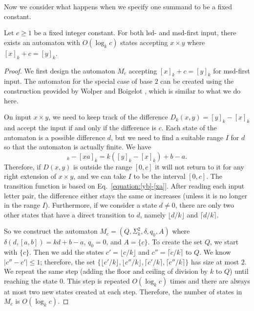 \documentclass[12pt,reqno]{article}
\begin{document}
Now we consider what happens when we specify one summand to be a fixed constant.
\begin{theorem} \label{theorem:[x]+c=[y]-construction}
Let $c \geq 1$ be a fixed integer constant.
For both lsd- and msd-first input, there exists an automaton with $O(\log_k c)$
states accepting $x \times y$ where $[x]_k + c = [y]_k$.
\end{theorem}

\begin{proof}
    We first design the automaton $M_c$ accepting $[x]_k + c = [y]_k$ for msd-first input.
    The automaton for the special case of base $2$ can be created using the construction provided by Wolper and Boigelot \cite{wolper_construction_2000}, which is similar to what we do here. 
    
    On input $x \times y$, we need to keep track of the difference $D_k(x, y) = [y]_k - [x]_k$ and accept the input if and only if the difference is $c$. Each state of the automaton is a possible difference $d$, but we need to find a suitable range $I$ for $d$ so that the automaton is actually finite.
    We have
  \begin{equation}
    [yb]_k - [xa]_k = k([y]_k-[x]_k) + b - a.
    \label{equation:[yb]-[xa]}
    \end{equation}
    Therefore, if $D(x, y)$ is outside the range $[0, c]$ it will not return to it for any right extension of $x\times y$, and  we can take $I$ to be the interval $[0, c]$.
    The transition function is based on Eq.~\eqref{equation:[yb]-[xa]}.  After reading each input letter pair, the difference either stays the same or increases (unless it is no longer in the range $I$).
    Furthermore, if we consider a state $d \neq 0$, there are only two other states that have a direct transition to $d$, namely $\lfloor d/k \rfloor$ and $\lceil 
d/k \rceil$.

So we construct the automaton $M_c = (Q, \Sigma^2_k, \delta, q_0, A)$ where $\delta(d, [a, b]) = kd + b - a$, $q_0 = 0$, and $A=\{c\}$. To create the set $Q$, we start with $\{ c\}$. Then we add the states  $c' = \lfloor c/k \rfloor$ and $c'' = \lceil 
c/k \rceil$ to $Q$. We know $|c'' - c'|\leq 1$; therefore, the set $\{ \lfloor c'/k \rfloor,  \lfloor c''/k \rfloor, \lceil c'/k \rceil, \lceil c''/k \rceil\}$ has size at most $2$.
We repeat the same step (adding the floor and ceiling of division by $k$ to $Q$) until reaching the state $0$.
This step is repeated $O(\log_k c)$ times and there are always at most two new states created at each step. Therefore, the number of states in $M_c$ is $O(\log _ k c)$.


\end{proof}
\end{document}
